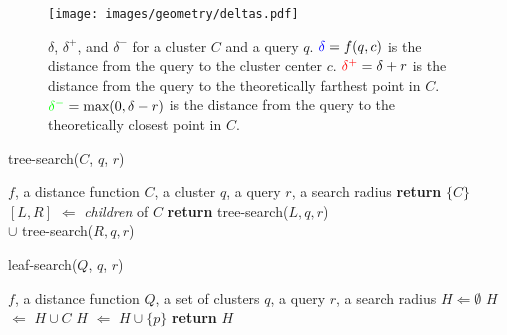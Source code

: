 \begin{figure}[t]
    \vskip -0.2in
    \centering
    \texttt{[image: images/geometry/deltas.pdf]}
    \caption{
        {\color{blue}$\delta$}, {\color{red}$\delta^{+}$}, and {\color{green}$\delta^{-}$} for a cluster $C$ and a query $q$.
        ${\color{blue}\delta} = f(q, c)$ is the distance from the query to the cluster center $c$.
        ${\color{red}\delta^{+}} = \delta + r$ is the distance from the query to the theoretically farthest point in $C$.
        ${\color{green}\delta^{-}} = \text{max}(0, \delta - r)$ is the distance from the query to the theoretically closest point in $C$.
    }
    \label{fig:methods:deltas}
\end{figure}
\FloatBarrier

\FloatBarrier
    \begin{algorithm}[!t]
        \caption{tree-search($C$, $q$, $r$)}
        \label{alg:methods:rnn-search:tree-search}
        \begin{algorithmic}[1]
            \REQUIRE $f$, a distance function
            \REQUIRE $C$, a cluster
            \REQUIRE $q$, a query
            \REQUIRE $r$, a search radius
                \STATE \textbf{return} $\{C\}$
            \ELSE
                \STATE $[L, R]$ $\Leftarrow$ \textit{children} of $C$
                \STATE \textbf{return} tree-search($L, q, r$) \\
                 $\cup$ tree-search($R, q, r$)
            \ENDIF
        \end{algorithmic}
    \end{algorithm}

    \begin{algorithm}[!t]
        \caption{leaf-search($Q$, $q$, $r$)}
        \label{alg:methods:rnn-search:leaf-search}
        \begin{algorithmic}[1]
            \REQUIRE $f$, a distance function
            \REQUIRE $Q$, a set of clusters
            \REQUIRE $q$, a query
            \REQUIRE $r$, a search radius
            \STATE $H \Leftarrow \emptyset$
                    \STATE $H$ $\Leftarrow$ $H \cup C$
                \ELSE
                            \STATE $H$ $\Leftarrow$ $H \cup \{p\}$
                        \ENDIF
                    \ENDFOR
                \ENDIF
            \ENDFOR
            \STATE \textbf{return} $H$
        \end{algorithmic}
    \end{algorithm}


